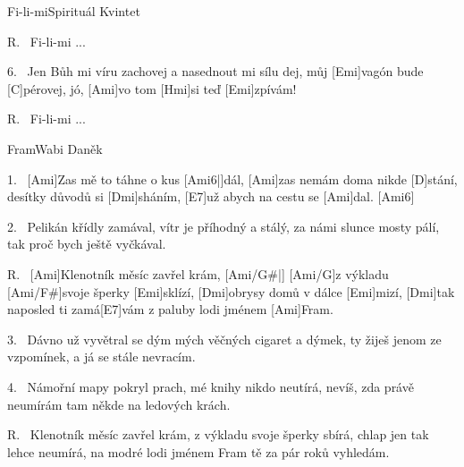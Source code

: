 \begin{song}{Fi-li-mi}{Spirituál Kvintet}
\begin{xverse}{R.~}
Fi-li-mi ...
\end{xverse}

\begin{xverse}{6.~}
Jen Bůh mi víru zachovej a nasednout mi sílu dej,
můj [\large Emi]vagón bude [\large C]pérovej,
jó, [\large Ami]vo tom [\large Hmi]si teď [\large Emi]zpívám!
\end{xverse}

\begin{xverse}{R.~}
Fi-li-mi ...
\end{xverse}

\end{song}

\begin{song}{Fram}{Wabi Daněk}

\begin{xverse}{1.~}
[\large Ami]Zas mě to táhne o kus [\large Ami6|]{dál,} [\large Ami]{zas} nemám doma nikde [\large D]stání,
desítky důvodů si [\large Dmi]sháním, [\large E7]už abych na cestu se [\large Ami]dal. [\large Ami6]{}
\end{xverse}

\begin{xverse}{2.~}
Pelikán křídly zamával, vítr je příhodný a stálý,
za námi slunce mosty pálí, tak proč bych ještě vyčkával.
\end{xverse}

\begin{xverse}{R.~}
[\large Ami]Klenotník měsíc zavřel krám, [\large Ami/G#|]{}
[\large Ami/G]{z vý}kladu [\large Ami/F#]svoje šperky [\large Emi]sklízí,
[\large Dmi]obrysy domů v dálce [\large Emi]mizí,
[\large Dmi]tak naposled ti zamá[\large E7]vám
z paluby lodi jménem [\large Ami]Fram.
\end{xverse}

\begin{xverse}{3.~}
Dávno už vyvětral se dým mých věčných cigaret a dýmek,
ty žiješ jenom ze vzpomínek, a já se stále nevracím.
\end{xverse}

\begin{xverse}{4.~}
Námořní mapy pokryl prach, mé knihy nikdo neutírá,
nevíš, zda právě neumírám tam někde na ledových krách.
\end{xverse}

\begin{xverse}{R.~}
Klenotník měsíc zavřel krám, z výkladu svoje šperky sbírá,
chlap jen tak lehce neumírá, na modré lodi jménem Fram
tě za pár roků vyhledám.
\end{xverse}

\end{song}
\chords{ \chordAmiSix \chordAmiGis \chordAmiG \chordAmiFis }

